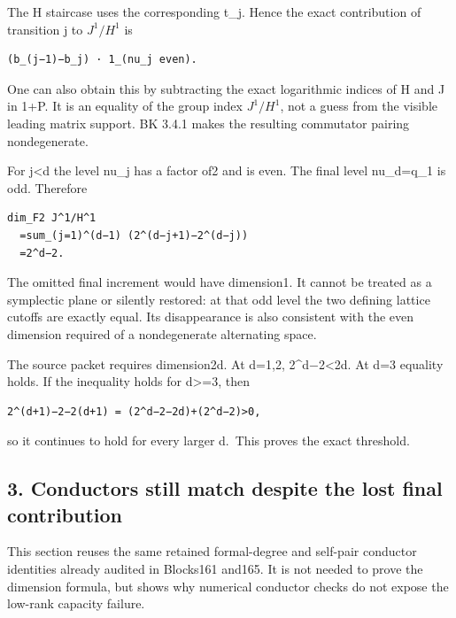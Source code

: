 The H staircase uses the corresponding t\_j. Hence the exact
contribution of transition j to \(J^1/H^1\) is

\begin{Verbatim}[fontsize=\small,breaklines=true,breakanywhere=true]
(b_(j−1)−b_j) · 1_(nu_j even).
\end{Verbatim}

One can also obtain this by subtracting the exact logarithmic indices of
H and J in 1+P. It is an equality of the group index
\textbar \(J^1/H^1\)\textbar, not a guess from the visible
leading matrix support. BK 3.4.1 makes the resulting commutator pairing
nondegenerate.

For j\textless d the level nu\_j has a factor of2 and is even. The final
level nu\_d=q\_1 is odd. Therefore

\begin{Verbatim}[fontsize=\small,breaklines=true,breakanywhere=true]
dim_F2 J^1/H^1
  =sum_(j=1)^(d−1) (2^(d−j+1)−2^(d−j))
  =2^d−2.
\end{Verbatim}

The omitted final increment would have dimension1. It cannot be treated
as a symplectic plane or silently restored: at that odd level the two
defining lattice cutoffs are exactly equal. Its disappearance is also
consistent with the even dimension required of a nondegenerate
alternating space.

The source packet requires dimension2d. At d=1,2, 2\^{}d−2\textless2d.
At d=3 equality holds. If the inequality holds for d\textgreater=3, then

\begin{Verbatim}[fontsize=\small,breaklines=true,breakanywhere=true]
2^(d+1)−2−2(d+1) = (2^d−2−2d)+(2^d−2)>0,
\end{Verbatim}

so it continues to hold for every larger d.~This proves the exact
threshold.

\hypertarget{dyadic_capacity-conductors-still-match-despite-the-lost-final-contribution}{%
\subsection{3. Conductors still match despite the lost final
contribution}\label{dyadic_capacity-conductors-still-match-despite-the-lost-final-contribution}}

This section reuses the same retained formal-degree and self-pair
conductor identities already audited in Blocks161 and165. It is not
needed to prove the dimension formula, but shows why numerical conductor
checks do not expose the low-rank capacity failure.


